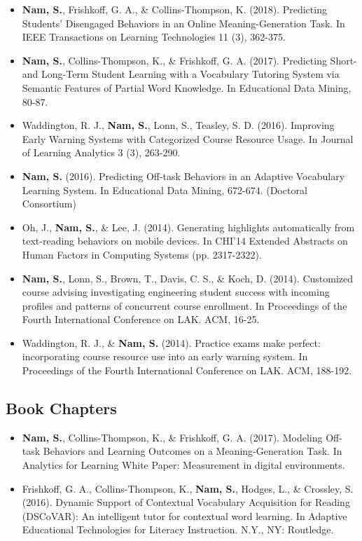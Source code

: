 \documentclass[11pt,a4paper]{article}
\begin{document}
\begin{itemize}
    \item \textbf{Nam, S.}, Frishkoff, G. A., \& Collins-Thompson, K. (2018). Predicting Students' Disengaged Behaviors in an Online Meaning-Generation Task. In IEEE Transactions on Learning Technologies 11 (3), 362-375.
    \item \textbf{Nam, S.}, Collins-Thompson, K., \& Frishkoff, G. A. (2017). Predicting Short- and Long-Term Student Learning with a Vocabulary Tutoring System via Semantic Features of Partial Word Knowledge. In Educational Data Mining, 80-87. %
    \item Waddington, R. J., \textbf{Nam, S.}, Lonn, S., Teasley, S. D. (2016). Improving Early Warning Systems with Categorized Course Resource Usage. In Journal of Learning Analytics 3 (3), 263-290.
    \item \textbf{Nam, S.} (2016). Predicting Off-task Behaviors in an Adaptive Vocabulary Learning System. In Educational Data Mining, 672-674. (Doctoral Consortium)
    \item Oh, J., \textbf{Nam, S.}, \& Lee, J. (2014). Generating highlights automatically from text-reading behaviors on mobile devices. In CHI'14 Extended Abstracts on Human Factors in Computing Systems (pp. 2317-2322).
    \item \textbf{Nam, S.}, Lonn, S., Brown, T., Davis, C. S., \& Koch, D. (2014). Customized course advising investigating engineering student success with incoming profiles and patterns of concurrent course enrollment. In Proceedings of the Fourth International Conference on LAK. ACM, 16-25. %
    \item Waddington, R. J., \& \textbf{Nam, S.} (2014). Practice exams make perfect: incorporating course resource use into an early warning system. In Proceedings of the Fourth International Conference on LAK. ACM, 188-192. %
\end{itemize}

\subsection*{Book Chapters}
\begin{itemize}
    \item \textbf{Nam, S.}, Collins-Thompson, K., \& Frishkoff, G. A. (2017). Modeling Off-task Behaviors and Learning Outcomes on a Meaning-Generation Task. In Analytics for Learning White Paper: Measurement in digital environments.
    \item Frishkoff, G. A., Collins-Thompson, K., \textbf{Nam, S.}, Hodges, L., \& Crossley, S. (2016). Dynamic Support of Contextual Vocabulary Acquisition for Reading (DSCoVAR): An intelligent tutor for contextual word learning. In Adaptive Educational Technologies for Literacy Instruction. N.Y., NY: Routledge.
\end{itemize}
\end{document}
